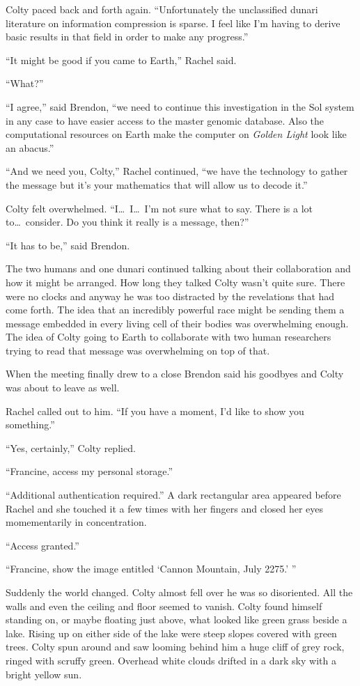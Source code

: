Colty paced back and forth again. ``Unfortunately the unclassified dunari literature on
information compression is sparse. I feel like I'm having to derive basic results in that field
in order to make any progress.''

``It might be good if you came to Earth,'' Rachel said.

``What?''

``I agree,'' said Brendon, ``we need to continue this investigation in the Sol system in any
case to have easier access to the master genomic database. Also the computational resources on
Earth make the computer on \textit{Golden Light} look like an abacus.''

``And we need you, Colty,'' Rachel continued, ``we have the technology to gather the message but
it's your mathematics that will allow us to decode it.''

Colty felt overwhelmed. ``I\ldots\ I\ldots\ I'm not sure what to say. There is a lot to\ldots\
consider. Do you think it really is a message, then?''

``It has to be,'' said Brendon.

The two humans and one dunari continued talking about their collaboration and how it might be
arranged. How long they talked Colty wasn't quite sure. There were no clocks and anyway he was
too distracted by the revelations that had come forth. The idea that an incredibly powerful race
might be sending them a message embedded in every living cell of their bodies was overwhelming
enough. The idea of Colty going to Earth to collaborate with two human researchers trying to
read that message was overwhelming on top of that.

When the meeting finally drew to a close Brendon said his goodbyes and Colty was about to leave
as well.

Rachel called out to him. ``If you have a moment, I'd like to show you something.''

``Yes, certainly,'' Colty replied.

``Francine, access my personal storage.''

``Additional authentication required.'' A dark rectangular area appeared before Rachel and she
touched it a few times with her fingers and closed her eyes momementarily in concentration.

``Access granted.''

``Francine, show the image entitled `Cannon Mountain, July 2275.' ''

Suddenly the world changed. Colty almost fell over he was so disoriented. All the walls and even
the ceiling and floor seemed to vanish. Colty found himself standing on, or maybe floating just
above, what looked like green grass beside a lake. Rising up on either side of the lake were
steep slopes covered with green trees. Colty spun around and saw looming behind him a huge cliff
of grey rock, ringed with scruffy green. Overhead white clouds drifted in a dark sky with a
bright yellow sun.

